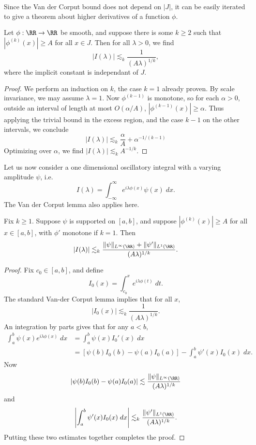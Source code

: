 Since the Van der Corput bound does not depend on $|J|$, it can be easily iterated to give a theorem about higher derivatives of a function $\phi$.

\begin{lemma}
  Let $\phi: \RR \to \RR$ be smooth, and suppose there is some $k \geq 2$ such that $|\phi^{(k)}(x)| \geq A$ for all $x \in J$. Then for all $\lambda > 0$, we find
  \[ |I(\lambda)| \lesssim_k \frac{1}{(A \lambda)^{1/k}}, \]
  where the implicit constant is independant of $J$.
\end{lemma}
\begin{proof}
  We perform an induction on $k$, the case $k = 1$ already proven. By scale invariance, we may assume $\lambda = 1$. Now $\phi^{(k-1)}$ is monotone, so for each $\alpha > 0$, outside an interval of length at most $O(\alpha/A)$, $|\phi^{(k-1)}(x)| \geq \alpha$. Thus applying the trivial bound in the excess region, and the case $k - 1$ on the other intervals, we conclude
  \[ |I(\lambda)| \lesssim_k \frac{\alpha}{A} + \alpha^{-1/(k-1)} \]
  Optimizing over $\alpha$, we find $|I(\lambda)| \lesssim_k A^{-1/k}$.
\end{proof}

Let us now consider a one dimensional oscillatory integral with a varying amplitude $\psi$, i.e.
%
\[ I(\lambda) = \int_{-\infty}^\infty e^{i \lambda \phi(x)} \psi(x)\; dx. \]
%
The Van der Corput lemma also applies here.

\begin{lemma}
  Fix $k \geq 1$. Suppose $\psi$ is supported on $[a,b]$, and suppose $|\phi^{(k)}(x)| \geq A$ for all $x \in [a,b]$, with $\phi'$ monotone if $k = 1$. Then 
  \[ |I(\lambda)| \lesssim_k \frac{\| \psi \|_{L^\infty(\RR)} + \| \psi' \|_{L^1(\RR)}}{(A \lambda)^{1/k}}. \]
\end{lemma}
\begin{proof}
  Fix $c_0 \in [a,b]$, and define
  \[ I_0(x) = \int_{c_0}^x e^{i \lambda \phi(t)}\; dt. \]
  The standard Van-der Corput lemma implies that for all $x$,
  \[ |I_0(x)| \lesssim_k \frac{1}{(A \lambda)^{1/k}}. \]
  An integration by parts gives that for any $a < b$,
  \begin{align*}
    \int_a^b \psi(x) e^{i \lambda \phi(x)}\; dx &= \int_a^b \psi(x) I_0'(x)\; dx\\
    &= [\psi(b) I_0(b) - \psi(a) I_0(a)] - \int_a^b \psi'(x) I_0(x)\; dx.
  \end{align*}
  Now
  \[ |\psi(b) I_0(b) - \psi(a) I_0(a)| \lesssim \frac{\| \psi \|_{L^\infty(\RR)}}{(A \lambda)^{1/k}} \]
  and
  \[ \left| \int_a^b \psi'(x) I_0(x)\; dx \right| \lesssim_k \frac{\| \psi' \|_{L^1(\RR)}}{(A \lambda)^{1/k}}. \]
  Putting these two estimates together completes the proof.
\end{proof}

